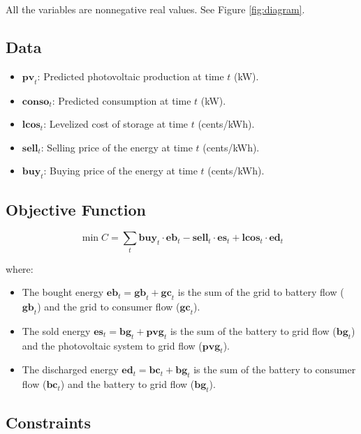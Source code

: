\documentclass[12pt]{article}
\begin{document}
All the variables are nonnegative real values. See Figure \ref{fig:diagram}.

\subsection{Data}

\begin{itemize}
\item $\mathbf{pv}_t$: Predicted photovoltaic production at time $t$ (kW).
\item $\mathbf{conso}_t$: Predicted consumption at time $t$ (kW).
\item $\mathbf{lcos}_t$: Levelized cost of storage at time $t$ (cents/kWh).
\item $\mathbf{sell}_t$: Selling price of the energy at time $t$ (cents/kWh).
\item $\mathbf{buy}_t$: Buying price of the energy at time $t$ (cents/kWh).
\end{itemize}

\subsection{Objective Function}

\begin{equation}
\min C = \sum_t \mathbf{buy}_t \cdot \mathbf{eb}_t - \mathbf{sell}_t \cdot \mathbf{es}_t + \mathbf{lcos}_t \cdot \mathbf{ed}_t
\end{equation}

where:

\begin{itemize}
\item The bought energy $\mathbf{eb}_t = \mathbf{gb}_t + \mathbf{gc}_t$ is the sum of the grid to battery flow ($\mathbf{gb}_t$) and the grid to consumer flow ($\mathbf{gc}_t$).
\item The sold energy $\mathbf{es}_t = \mathbf{bg}_t + \mathbf{pvg}_t$ is the sum of the battery to grid flow ($\mathbf{bg}_t$) and the photovoltaic system to grid flow ($\mathbf{pvg}_t$).
\item The discharged energy $\mathbf{ed}_t = \mathbf{bc}_t + \mathbf{bg}_t$ is the sum of the battery to consumer flow ($\mathbf{bc}_t$) and the battery to grid flow ($\mathbf{bg}_t$).
\end{itemize}

\subsection{Constraints}
\end{document}
